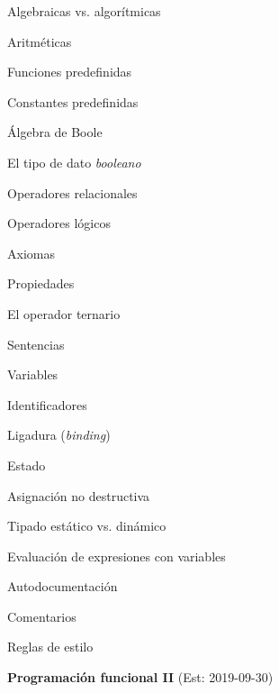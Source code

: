 \begin{longenum}
\begin{longenum}
\begin{longenum}
\begin{longenum}
\begin{longenum}
                \end{longenum}
            \end{longenum}
            \item Algebraicas vs. algorítmicas
            \item Aritméticas
            \item Funciones predefinidas
            \item Constantes predefinidas
        \end{longenum}
        \item Álgebra de Boole
        \begin{longenum}
            \item El tipo de dato \textit{booleano}
            \item Operadores relacionales
            \item Operadores lógicos
            \item Axiomas
            \item Propiedades
            \item El operador ternario
        \end{longenum}
        \item Sentencias
        \begin{longenum}
            \item Variables
            \begin{longenum}
                \item Identificadores
                \item Ligadura (\textit{binding})
                \item Estado
                \item Asignación no destructiva
                \item Tipado estático vs. dinámico
            \end{longenum}
            \item Evaluación de expresiones con variables
        \end{longenum}
        \item Autodocumentación
        \begin{longenum}
            \item Comentarios
            \item Reglas de estilo
        \end{longenum}
    \end{longenum}
    \item \textbf{Programación funcional II}  (Est: 2019-09-30)

\end{longenum}

